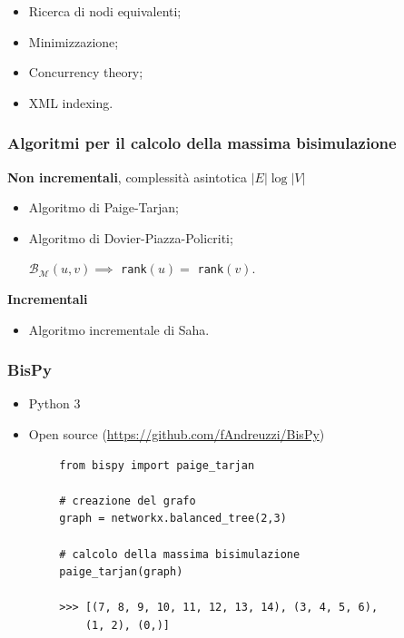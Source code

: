 \documentclass{beamer}
\begin{document}
\begin{frame}
    \bigskip

    \begin{multicols}{2}
        \begin{itemize}
            \item Ricerca di nodi equivalenti;
            \item Minimizzazione;
            \item Concurrency theory;
            \item XML indexing.
        \end{itemize}
    \end{multicols}
\end{frame}

\begin{frame}\frametitle{Algoritmi per il calcolo della massima bisimulazione}
    \textbf{Non incrementali}, complessità asintotica $|E| \log |V|$
    \begin{itemize}
        \item Algoritmo di Paige-Tarjan;
        \item Algoritmo di Dovier-Piazza-Policriti;

        \qquad $\mathcal{B}_\mathcal{M}(u,v) \implies$ \texttt{rank}$(u) =$ \texttt{rank}$(v)$.
    \end{itemize}

    \bigskip

    \textbf{Incrementali}
    \begin{itemize}
        \item Algoritmo incrementale di Saha.
    \end{itemize}
\end{frame}

\begin{frame}[fragile]\frametitle{BisPy}
    \begin{itemize}
        \item Python 3
        \item Open source (\url{https://github.com/fAndreuzzi/BisPy})
    \end{itemize}


    \begin{example}
        \begin{verbatim}
        from bispy import paige_tarjan

        # creazione del grafo
        graph = networkx.balanced_tree(2,3)

        # calcolo della massima bisimulazione
        paige_tarjan(graph)

        >>> [(7, 8, 9, 10, 11, 12, 13, 14), (3, 4, 5, 6),
            (1, 2), (0,)]
        \end{verbatim}
    \end{example}
\end{frame}
\end{document}
